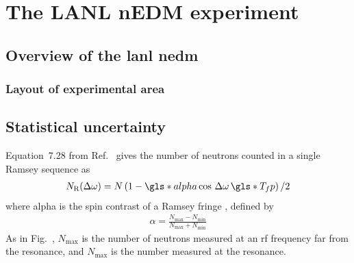 
\chapter{The LANL nEDM experiment}\label{chap:LANL_nEDM}



\section{
    \texorpdfstring{Overview of the \acrshort{lanl} \acrshort{nedm}}
                    {Overview of the LANL nEDM}
}



\subsection{Layout of experimental area}



\section{Statistical uncertainty}


Equation~7.28 from Ref.~\cite{golubUCN} gives the number of neutrons counted in a single Ramsey sequence as
%
\begin{gather}
    N_\text{R}(\Delta \omega) = N \left( 1 - \gls*{alpha} \cos \,\Delta \omega \, \gls*{T_fp} \right)/2
\end{gather}
%
where \gls*{alpha} is the spin contrast of a Ramsey fringe , defined by
%
\begin{gather}
    \alpha = \frac{N_\text{max} - N_\text{min}} {N_\text{max} + N_\text{min}} \label{eq:alpha}
\end{gather}
%
As in Fig.~, $N_\text{max}$ is the number of neutrons measured at an \acrshort*{rf} frequency far from the resonance, and $N_\text{max}$ is the number measured at the resonance.

